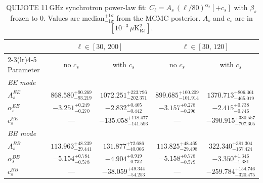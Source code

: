 \begin{table}[htbp]
\centering
\caption{QUIJOTE 11\,GHz synchrotron power-law fit: $C_\ell = A_s\,(\ell/80)^{\alpha_s} [+ c_s]$ with $\beta_s$ frozen to 0. Values are median$^{+1\sigma}_{-1\sigma}$ from the MCMC posterior. $A_s$ and $c_s$ are in $[10^{-3}\,\mu\mathrm{K}^2_\mathrm{RJ}]$.}
\label{tab:sync_11ghz}
\begin{tabular}{lcccc}
\toprule
& \multicolumn{2}{c}{$\ell \in [30,\,200]$} & \multicolumn{2}{c}{$\ell \in [30,\,120]$} \\
\cmidrule(lr){2-3}\cmidrule(lr){4-5}
Parameter & no $c_s$ & with $c_s$ & no $c_s$ & with $c_s$ \\
\midrule
\multicolumn{5}{l}{\textit{EE mode}} \\
$A_s^{EE}$ & $868.580^{+90.269}_{-93.219}$ & $1072.251^{+223.796}_{-202.371}$ & $899.685^{+100.209}_{-101.914}$ & $1370.713^{+806.361}_{-465.019}$ \\
$\alpha_s^{EE}$ & $-3.251^{+0.249}_{-0.270}$ & $-2.832^{+0.405}_{-0.442}$ & $-3.157^{+0.278}_{-0.296}$ & $-2.415^{+0.738}_{-0.746}$ \\
$c_s^{EE}$ & \multicolumn{1}{c}{---} & $-135.058^{+118.477}_{-141.593}$ & \multicolumn{1}{c}{---} & $-390.915^{+380.557}_{-707.305}$ \\
\midrule
\multicolumn{5}{l}{\textit{BB mode}} \\
$A_s^{BB}$ & $113.963^{+48.239}_{-29.441}$ & $131.877^{+72.686}_{-40.066}$ & $113.825^{+48.469}_{-29.498}$ & $322.340^{+381.304}_{-167.424}$ \\
$\alpha_s^{BB}$ & $-5.154^{+0.784}_{-0.578}$ & $-4.904^{+0.919}_{-0.732}$ & $-5.158^{+0.778}_{-0.579}$ & $-3.350^{+1.346}_{-1.381}$ \\
$c_s^{BB}$ & \multicolumn{1}{c}{---} & $-38.059^{+49.344}_{-54.253}$ & \multicolumn{1}{c}{---} & $-259.784^{+154.746}_{-320.475}$ \\
\bottomrule
\end{tabular}
\end{table}
